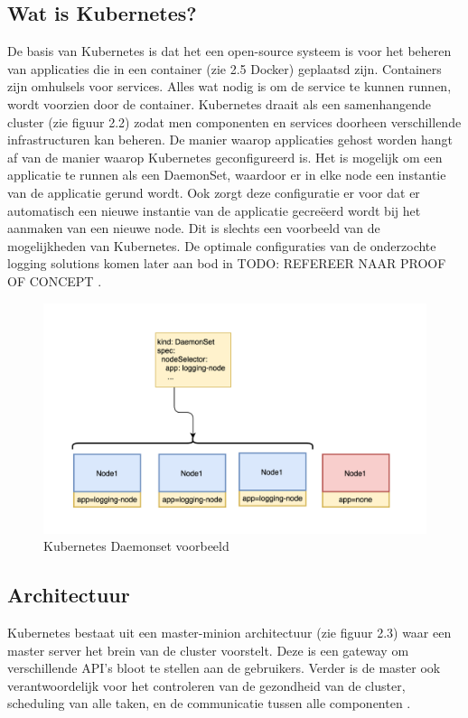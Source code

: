 \subsection{Wat is Kubernetes?}
De basis van Kubernetes is dat het een open-source systeem is voor het beheren van applicaties die in een container (zie 2.5 Docker) geplaatsd zijn. Containers zijn omhulsels voor services. Alles wat nodig is om de service te kunnen runnen, wordt voorzien door de container. Kubernetes draait als een samenhangende cluster (zie figuur 2.2) zodat men  componenten en services doorheen verschillende infrastructuren kan beheren. De manier waarop applicaties gehost worden hangt af van de manier waarop Kubernetes geconfigureerd is. Het is mogelijk om een applicatie te runnen als een DaemonSet, waardoor er in elke node een instantie van de applicatie gerund wordt. Ook zorgt deze configuratie er voor dat er automatisch een nieuwe instantie van de applicatie gecreëerd wordt bij het aanmaken van een nieuwe node. Dit is slechts een voorbeeld van de mogelijkheden van Kubernetes. De optimale configuraties van de onderzochte logging solutions komen later aan bod in TODO: REFEREER NAAR PROOF OF CONCEPT \autocite{ellingwood2018}.

\begin{figure}[ht]
    \centering
    \includegraphics[scale=0.4]{img/kubernetes_daemonset}
    \caption[Kubernetes DaemonSet voorbeeld]{Kubernetes Daemonset voorbeeld \cite{techstories2017}}
\end{figure}

\subsection{Architectuur}
Kubernetes bestaat uit een master-minion architectuur (zie figuur 2.3) waar een master server het brein van de cluster voorstelt. Deze is een gateway om verschillende API's bloot te stellen aan de gebruikers. Verder is de master ook verantwoordelijk voor het controleren van de gezondheid van de cluster, scheduling van alle taken, en de communicatie tussen alle componenten \autocite{ellingwood2018}.

